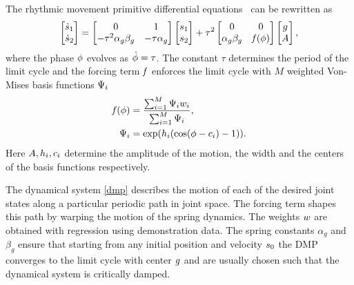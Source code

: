 The rhythmic movement primitive differential equations~\cite{Kober08} can be rewritten as
%
\begin{equation}
\begin{aligned}
\begin{bmatrix}
   \dot{s}_1 \\
   \dot{s}_2
 \end{bmatrix} = \begin{bmatrix}
     0 & 1  \\
     -\tau^2 \alpha_{g} \beta_{g} & - \tau \alpha_{g}  
  \end{bmatrix}\begin{bmatrix}
     s_1 \\
     s_2
   \end{bmatrix} + 
\tau^{2}\begin{bmatrix}
0 & 0 \\
\alpha_{g} \beta_{g} & \mathit{f}(\phi)
\end{bmatrix} \begin{bmatrix}
g \\ A
\end{bmatrix}
\label{dmp},
\end{aligned}
\end{equation}
%
\noindent where the phase $\phi$ evolves as $\dot{\phi} = \tau$. The constant $\tau$ determines the period of the limit cycle and the forcing term $\mathit{f}$ enforces the limit cycle with $M$ weighted Von-Mises basis functions $\Psi_i$
%
\begin{equation}
\begin{aligned}
\mathit{f}(\phi) &= \frac{\sum_{i=1}^{M}\Psi_i w_i}{\sum_{i=1}^{M}\Psi_i}, \\
\Psi_i &= \exp(h_i (\cos(\phi - c_i) - 1)).
\label{forcing}
\end{aligned}
\end{equation}
%
\noindent Here $A, h_i, c_i$ determine the amplitude of the motion, the width and the centers of the basis functions respectively.

The dynamical system \eqref{dmp} describes the motion of each of the desired joint states along a particular periodic path in joint space. The forcing term shapes this path by warping the motion of the spring dynamics. The weights $w$ are obtained with regression using demonstration data. The spring constants $\alpha_{g}$ and $\beta_{g}$ ensure that starting from any initial position and velocity $s_0$ the DMP converges to the limit cycle with center $g$ and are usually chosen such that the dynamical system is critically damped.

